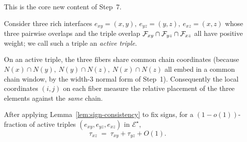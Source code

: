 This is the core new content of Step~7.

Consider three rich interfaces
$e_{xy}=(x,y),\ e_{yz}=(y,z),\ e_{xz}=(x,z)$
whose three pairwise overlaps and the triple overlap
$\mathcal{F}_{xy}\cap\mathcal{F}_{yz}\cap\mathcal{F}_{xz}$ all have positive weight;
we call such a triple an \emph{active triple}.

On an active triple, the three fibers share common chain coordinates
(because $N(x)\cap N(y),\ N(y)\cap N(z),\ N(x)\cap N(z)$ all embed in
a common chain window, by the width-3 normal form of Step~1).
Consequently the local coordinates $(i,j)$ on each fiber measure the
relative placement of the three elements against the \emph{same}
chain.

\begin{lemma}\label{lem:cocycle}
After applying Lemma~\ref{lem:sign-consistency} to fix signs, for a
$(1-o(1))$-fraction of active triples $(e_{xy},e_{yz},e_{xz})$ in
$\mathcal{E}^\star$,
\[
  \tau_{xz} \;=\; \tau_{xy} + \tau_{yz} + O(1).
\]
\end{lemma}

